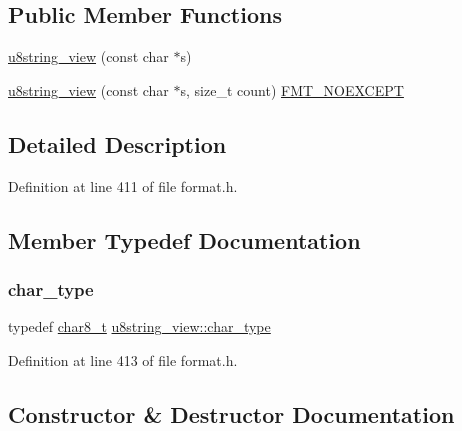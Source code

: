 \subsection*{Public Member Functions}
\begin{DoxyCompactItemize}
\item 
\hyperlink{classu8string__view_a57d3b2e6c9febc4289c936faf413633f}{u8string\+\_\+view} (const char $\ast$s)
\item 
\hyperlink{classu8string__view_a29121b197fae2d1b2e373cdf66f99c48}{u8string\+\_\+view} (const char $\ast$s, size\+\_\+t count) \hyperlink{core_8h_aef128913e8400683b1cbd1a3a2e11df3}{F\+M\+T\+\_\+\+N\+O\+E\+X\+C\+E\+PT}
\end{DoxyCompactItemize}


\subsection{Detailed Description}


Definition at line 411 of file format.\+h.



\subsection{Member Typedef Documentation}
\mbox{\label{classu8string__view_af54c5d2c42c445a7031e8ec2b5b458be}} 
\subsubsection{\texorpdfstring{char\+\_\+type}{char\_type}}
{\footnotesize\ttfamily typedef \hyperlink{format_8h_ad71c872603735b57c8417f76de44077b}{char8\+\_\+t} \hyperlink{format_8h_ad71c872603735b57c8417f76de44077b}{u8string\+\_\+view\+::char\+\_\+type}}



Definition at line 413 of file format.\+h.



\subsection{Constructor \& Destructor Documentation}
\mbox{\label{classu8string__view_a57d3b2e6c9febc4289c936faf413633f}} 
